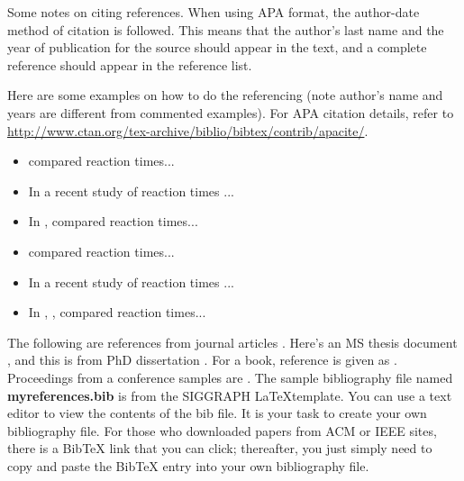 Some notes on citing references.   When using APA format, the author-date method of citation is 
followed.   This means that the author's last name and the year of publication for the source should 
appear in the text, and a complete reference should appear in the reference list.

%
%

Here are some examples on how to do the referencing (note author's name and years are different
from commented examples).  For APA citation details, refer
to \url{http://www.ctan.org/tex-archive/biblio/bibtex/contrib/apacite/}. 

\begin{itemize}
 \item {} compared reaction times...
 \item In a recent study of reaction times \cite{kartch:2000:ERA}...
 \item In , \citeauthor{kartch:2000:ERA} compared reaction times...
 \item {} compared reaction times... 
 \item In a recent study of reaction times \cite{fedkiw:2001:VSO}...
 \item In , , compared reaction times...
\end{itemize}

The following are references from journal articles \cite{Park:2006:DSI, Pellacini:2005:LAH, 
sako:2001:SSB}.  Here's an MS thesis document \cite{yee:2000:SSA}, and this is from
PhD dissertation \cite{kartch:2000:ERA}. For a book, reference is given as 
\cite{parke:1996:CFA}.  Proceedings from a conference samples are \cite{Jobs95, fedkiw:2001:VSO,
levoy:2000:TDM}.  The sample bibliography file named \textbf{myreferences.bib} is from the
SIGGRAPH \LaTeX template.  You can use a text editor to view the contents of the bib file.  
It is your task to create your own bibliography file.  For those who downloaded papers from
ACM or IEEE sites, there is a BibTeX link that you can click; thereafter, you just simply need
to copy and paste the BibTeX entry into your own bibliography file.



